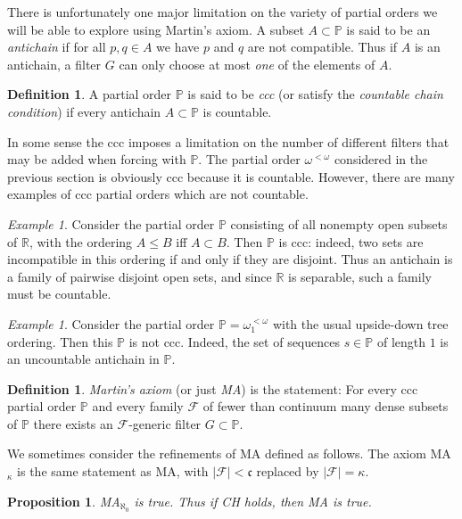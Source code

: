 \documentclass[11pt,oneside]{amsbook}
\newcommand{\PP}{\mathbb P}
\newcommand{\RR}{\mathbb R}
\theoremstyle{definition}
\theoremstyle{plain}
\newtheorem{prop}[thm]{Proposition}
\theoremstyle{definition}
\newtheorem{defn}[thm]{Definition}
\theoremstyle{remark}
\newtheorem{example}[thm]{Example}
\begin{document}
There is unfortunately one major limitation on the variety of partial orders we will be able to explore using Martin's axiom. A subset $A\subset\PP$ is said to be an \emph{antichain} if for all $p,q\in A$ we have $p$ and $q$ are not compatible. Thus if $A$ is an antichain, a filter $G$ can only choose at most \emph{one} of the elements of $A$.

\begin{defn}
  A partial order $\PP$ is said to be \emph{ccc} (or satisfy the \emph{countable chain condition}) if every antichain $A\subset\PP$ is countable.
\end{defn}

In some sense the ccc imposes a limitation on the number of different filters that may be added when forcing with $\PP$. The partial order $\omega^{<\omega}$ considered in the previous section is obviously ccc because it is countable. However, there are many examples of ccc partial orders which are not countable.

\begin{example}
  \label{ex:cohen-ccc}
  Consider the partial order $\PP$ consisting of all nonempty open subsets of $\RR$, with the ordering $A\leq B$ iff $A\subset B$. Then $\PP$ is ccc: indeed, two sets are incompatible in this ordering if and only if they are disjoint. Thus an antichain is a family of pairwise disjoint open sets, and since $\RR$ is separable, such a family must be countable.
\end{example}

\begin{example}
  Consider the partial order $\PP=\omega_1^{<\omega}$ with the usual upside-down tree ordering. Then this $\PP$ is not ccc. Indeed, the set of sequences $s\in\PP$ of length $1$ is an uncountable antichain in $\PP$.
\end{example}

\begin{defn}
  \emph{Martin's axiom} (or just \emph{MA}) is the statement: For every ccc partial order $\PP$ and every family $\mathcal F$ of fewer than continuum many dense subsets of $\PP$ there exists an $\mathcal F$-generic filter $G\subset\PP$.
\end{defn}

We sometimes consider the refinements of MA defined as follows. The axiom MA$_\kappa$ is the same statement as MA, with $|\mathcal F|<\mathfrak c$ replaced by $|\mathcal F|=\kappa$.

\begin{prop}
  \label{prop:ma-aleph0}
  MA$_{\aleph_0}$ is true. Thus if CH holds, then MA is true.
\end{prop}
\end{document}
